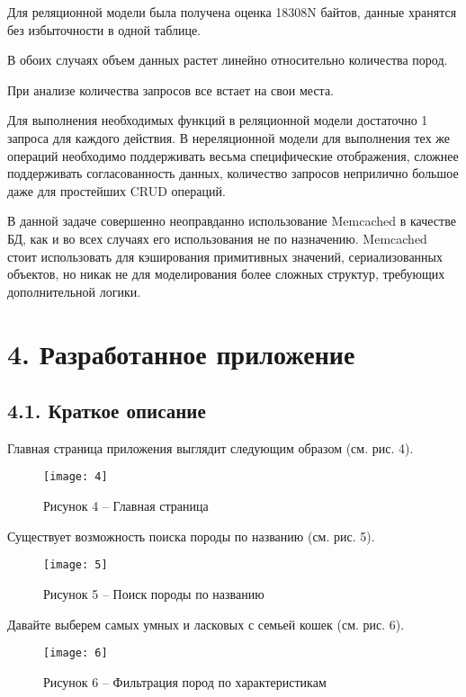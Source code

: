 Для реляционной модели была получена оценка 18308N байтов, данные хранятся без избыточности в одной таблице.

В обоих случаях объем данных растет линейно относительно количества пород.

При анализе количества запросов все встает на свои места.

Для выполнения необходимых функций в реляционной модели достаточно 1 запроса для каждого действия.
В нереляционной модели для выполнения тех же операций необходимо поддерживать весьма специфические отображения,
сложнее поддерживать согласованность данных, количество запросов неприлично большое даже для простейших CRUD операций.

В данной задаче совершенно неоправданно использование Memcached в качестве БД, как и во всех случаях его использования
не по назначению.
Memcached стоит использовать для кэширования примитивных значений, сериализованных объектов, но никак не для моделирования
более сложных структур, требующих дополнительной логики.

\pagebreak
{}
\section*{4. Разработанное приложение}
\subsection*{4.1. Краткое описание}
Главная страница приложения выглядит следующим образом (см. рис. 4).
\begin{figure}[H]
    \centering
    \texttt{[image: 4]}
    \caption*{Рисунок 4 -- Главная страница}
    \label{fig:4}
\end{figure}

Существует возможность поиска породы по названию (см. рис. 5).
\begin{figure}[H]
    \centering
    \texttt{[image: 5]}
    \caption*{Рисунок 5 -- Поиск породы по названию}
    \label{fig:5}
\end{figure}

Давайте выберем самых умных и ласковых с семьей кошек (см. рис. 6).
\begin{figure}[H]
    \centering
    \texttt{[image: 6]}
    \caption*{Рисунок 6 -- Фильтрация пород по характеристикам}
    \label{fig:6}
\end{figure}

